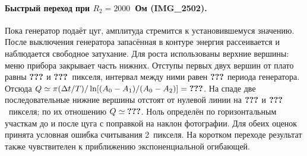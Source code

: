 \documentclass[a4paper,12pt]{article}
\makeatletter
\newcommand{\qq}{\textbf{???}}
\newcommand{\res}[1]{\ifcsname res@#1\endcsname\ensuremath{\csname res@#1\endcsname}\else\qq\fi}
\makeatother
\begin{document}
\paragraph{Быстрый переход при $R_2=2000$~Ом (IMG\_2502).}
Пока генератор подаёт цуг, амплитуда стремится к установившемуся значению. После выключения генератора запасённая в контуре энергия рассеивается и наблюдается свободное затухание. Для роста использованы верхние вершины: меню прибора закрывает часть нижних. Отступы первых двух вершин от плато равны $\res{riseFirst}$ и $\res{riseSecond}$~пикселя, интервал между ними равен $\res{riseCycles}$ периода генератора. Отсюда $Q\simeq\pi(\Delta t/T)/\ln[(A_0-A_1)/(A_0-A_2)]=\res{rise2}$. На спаде две последовательные нижние вершины отстоят от нулевой линии на $\res{fallFirst}$ и $\res{fallSecond}$~пикселя; по их отношению $Q\simeq\res{fall2}$. Ноль определён по горизонтальным участкам до и после цуга с поправкой на наклон фотографии. Для обеих оценок принята условная ошибка считывания 2~пикселя. На коротком переходе результат также чувствителен к приближению экспоненциальной огибающей.
\end{document}
